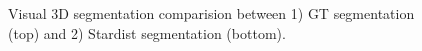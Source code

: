 \documentclass[letterpaper,compsoc,twoside]{IEEEtran}
\begin{document}
\begin{figure}[]
\label{fig-gtstar}\noindent{}
\caption{Visual 3D segmentation comparision between 1) GT segmentation (top) and 2) Stardist segmentation (bottom).}
\end{figure}
\end{document}
